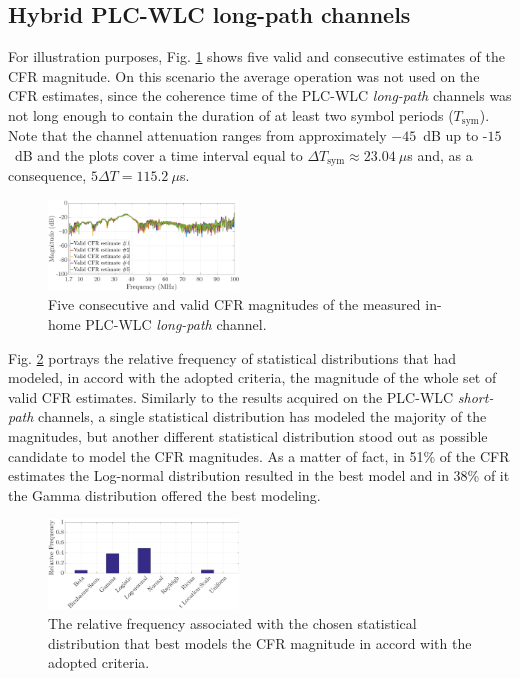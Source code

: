 \documentclass[journal]{IEEEtran}
\begin{document}
\subsection{Hybrid PLC-WLC long-path channels}\label{sec:MMHYBL}

For illustration purposes, Fig. \ref{respfreqlW} shows five valid and consecutive estimates of the \ac{CFR} magnitude. On this scenario the average operation was not used on the \ac{CFR} estimates, since the coherence time of the \ac{PLC}-\ac{WLC} \textit{long-path} channels was not long enough to contain the duration of at least two symbol periods ($T_{\textrm{sym}}$). Note that the channel attenuation ranges from approximately $-45$~dB up to -$15$~dB and the plots cover a time interval equal to $\Delta T_{\textrm{sym}}\approx23.04~\mu$s and, as a consequence, $5\Delta T = 115.2~\mu$s.

\begin{figure}[h]
	\centering
	\includegraphics[width=0.45\textwidth]{images/respfreqlW.eps}
	\caption{Five consecutive and valid CFR magnitudes of the measured in-home PLC-WLC \textit{long-path} channel.}
	\label{respfreqlW}
\end{figure}

Fig. \ref{MAG_percentlW} portrays the relative frequency of statistical distributions that had modeled, in accord with the adopted criteria, the magnitude of the whole set of valid \ac{CFR} estimates. Similarly to the results acquired on the \ac{PLC}-\ac{WLC} \textit{short-path} channels, a single statistical distribution has modeled the majority of the magnitudes, but another different statistical distribution stood out as possible candidate to model the \ac{CFR} magnitudes. As a matter of fact, in 51\% of the \ac{CFR} estimates the Log-normal distribution resulted in the best model and in 38\% of it the Gamma distribution offered the best modeling. 

\begin{figure}[h!]
	\centering
	\includegraphics[width=0.45\textwidth]{images/Mag_percentlW.eps}
	\caption{The relative frequency associated with the chosen statistical distribution that best models the CFR magnitude in accord with the adopted criteria.}
	\label{MAG_percentlW}
\end{figure}
\end{document}
